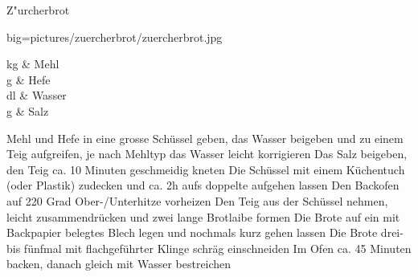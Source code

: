 \begin{recipe}
	[ 
	preparationtime = {\unit[120]{min}},
	bakingtime = {\unit[45]{min}},
	bakingtemperature={\protect\bakingtemperature{fanoven=\unit[220]{°C}}},
	portion = 2 Brote,
	calory
	]
	{Z"urcherbrot}
	
	\graph
	{
		big=pictures/zuercherbrot/zuercherbrot.jpg
	}
	
	\ingredients
	{
		\unit[1]{kg} & Mehl \\
		\unit[30]{g} & Hefe \\
		\unit[7]{dl} & Wasser \\
		\unit[20]{g} & Salz
	}
	
	\preparation
	{%
		\step Mehl und Hefe in eine grosse Schüssel geben, das Wasser beigeben und zu einem Teig aufgreifen, je nach Mehltyp das Wasser leicht korrigieren
		\step Das Salz beigeben, den Teig ca. 10 Minuten geschmeidig kneten
		\step Die Schüssel mit einem Küchentuch (oder Plastik) zudecken und ca. 2h aufs doppelte aufgehen lassen
		\step Den Backofen auf 220 Grad Ober-/Unterhitze vorheizen
		\step Den Teig aus der Schüssel nehmen, leicht zusammendrücken und zwei lange Brotlaibe formen
		\step Die Brote auf ein mit Backpapier belegtes Blech legen und nochmals kurz gehen lassen		
		\step Die Brote drei- bis fünfmal mit flachgeführter Klinge schräg einschneiden
		\step Im Ofen ca. 45 Minuten backen, danach gleich mit Wasser bestreichen
	}
	
\end{recipe}